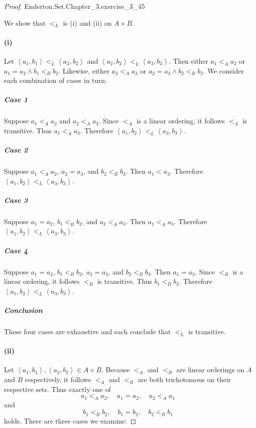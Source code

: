 \documentclass{report}
\newcommand{\pair}[1]{\left< #1 \right>}
\begin{document}
\begin{proof}

    {Enderton.Set.Chapter\_3.exercise\_3\_45}

  We show that $<_L$ is (i)  and (ii)
     on $A \times B$.

  \paragraph{(i)}%

    Let $\pair{a_1, b_1} <_L \pair{a_2, b_2}$ and
      $\pair{a_2, b_2} <_L \pair{a_3, b_3}$.
    Then either $a_1 <_A a_2$ or $a_1 = a_2 \land b_1 <_B b_2$.
    Likewise, either $a_2 <_A a_3$ or $a_2 = a_3 \land b_2 <_B b_3$.
    We consider each combination of cases in turn:

    \subparagraph{Case 1}%

      Suppose $a_1 <_A a_2$ and $a_2 <_A a_3$.
      Since $<_A$ is a linear ordering, it follows $<_A$ is transitive.
      Thus $a_1 <_A a_3$.
      Therefore $\pair{a_1, b_2} <_L \pair{a_3, b_3}$.

    \subparagraph{Case 2}%

      Suppose $a_1 <_A a_2$, $a_2 = a_3$, and $b_2 <_B b_3$.
      Then $a_1 < a_3$.
      Therefore $\pair{a_1, b_2} <_L \pair{a_3, b_3}$.

    \subparagraph{Case 3}%

      Suppose $a_1 = a_2$, $b_1 <_B b_2$, and $a_2 <_A a_3$.
      Then $a_1 <_A a_3$.
      Therefore $\pair{a_1, b_2} <_L \pair{a_3, b_3}$.

    \subparagraph{Case 4}%

      Suppose $a_1 = a_2$, $b_1 <_B b_2$, $a_2 = a_3$, and $b_2 <_B b_3$.
      Then $a_1 = a_3$.
      Since $<_B$ is a linear ordering, it follows $<_B$ is transitive.
      Thus $b_1 <_B b_3$.
      Therefore $\pair{a_1, b_2} <_L \pair{a_3, b_3}$.

    \subparagraph{Conclusion}%

      These four cases are exhaustive and each conclude that $<_L$ is
        transitive.

  \paragraph{(ii)}%

    Let $\pair{a_1, b_1}, \pair{a_2, b_2} \in A \times B$.
    Because $<_A$ and $<_B$ are linear orderings on $A$ and $B$ respectively,
      it follows $<_A$ and $<_B$ are both trichotomous on their respective sets.
    Thus exactly one of $$a_1 <_A a_2, \quad a_1 = a_2, \quad a_2 <_A a_1$$
      and $$b_1 <_B b_2, \quad b_1 = b_2, \quad b_2 <_B b_1$$ holds.
    There are three cases we examine:


\end{proof}
\end{document}
